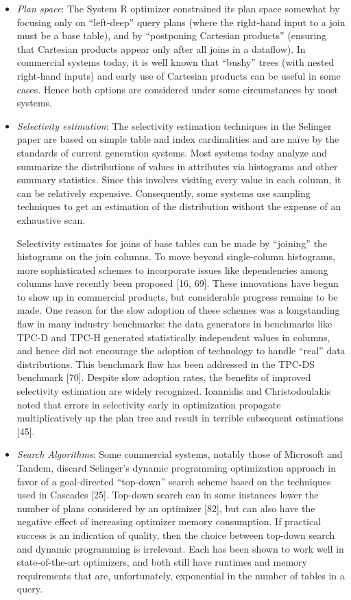 \documentclass[a4paper,11pt,twoside,openright]{book}
\begin{document}
\begin{itemize}
\item
  \emph{Plan space}: The System R optimizer constrained its plan space
  somewhat by focusing only on ``left-deep'' query plans (where the
  right-hand input to a join must be a base table), and by ``postponing
  Cartesian products'' (ensuring that Cartesian products appear only
  after all joins in a dataflow). In commercial systems today, it is
  well known that ``bushy'' trees (with nested right-hand inputs) and
  early use of Cartesian products can be useful in some cases. Hence
  both options are considered under some circumstances by most systems.
\item
  \emph{Selectivity estimation}: The selectivity estimation techniques
  in the Selinger paper are based on simple table and index
  cardinalities and are na\"ive by the standards of current generation
  systems. Most systems today analyze and summarize the distributions of
  values in attributes via histograms and other summary statistics.
  Since this involves visiting every value in each column, it can be
  relatively expensive. Consequently, some systems use sampling
  techniques to get an estimation of the distribution without the
  expense of an exhaustive scan.

Selectivity estimates for joins of base tables can be made by
``joining'' the histograms on the join columns. To move beyond
single-column histograms, more sophisticated schemes to incorporate
issues like dependencies among columns have recently been proposed
{[}16, 69{]}. These innovations have begun to show up in commercial
products, but considerable progress remains to be made. One reason for
the slow adoption of these schemes was a longstanding flaw in many
industry benchmarks: the data generators in benchmarks like TPC-D and
TPC-H generated statistically independent values in columns, and hence
did not encourage the adoption of technology to handle ``real'' data
distributions. This benchmark flaw has been addressed in the TPC-DS
benchmark {[}70{]}. Despite slow adoption rates, the benefits of
improved selectivity estimation are widely recognized. Ioannidis and
Christodoulakis noted that errors in selectivity early in optimization
propagate multiplicatively up the plan tree and result in terrible
subsequent estimations {[}45{]}.

\item
  \emph{Search Algorithms}: Some commercial systems, notably those of
  Microsoft and Tandem, discard Selinger's dynamic programming
  optimization approach in favor of a goal-directed ``top-down'' search
  scheme based on the techniques used in Cascades {[}25{]}. Top-down
  search can in some instances lower the number of plans considered by
  an optimizer {[}82{]}, but can also have the negative effect of
  increasing optimizer memory consumption. If practical success is an
  indication of quality, then the choice between top-down search and
  dynamic programming is irrelevant. Each has been shown to work well in
  state-of-the-art optimizers, and both still have runtimes and memory
  requirements that are, unfortunately, exponential in the number of
  tables in a query.


\end{itemize}
\end{document}
